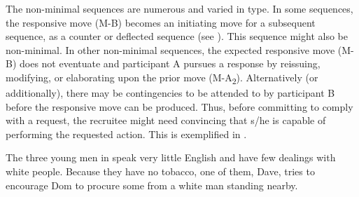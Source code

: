 \documentclass[output=paper,nonflat,colorlinks,citecolor=brown]{langsci/langscibook}
\begin{document}
The non-minimal sequences are numerous and varied in type. In some sequences, the responsive move (M-B) becomes an initiating move for a subsequent sequence, as a counter or deflected sequence (see ). This sequence might also be non-minimal. In other non-minimal sequences, the expected responsive move (M-B) does not eventuate and participant A pursues a response by reissuing, modifying, or elaborating upon the prior move (M-A\textsubscript{2}). Alternatively (or additionally), there may be contingencies to be attended to by participant B before the responsive move can be produced. Thus, before committing to comply with a request, the recruitee might need convincing that s/he is capable of performing the requested action. This is exemplified in .

The three young men in  speak very little English and have few dealings with white people. Because they have no tobacco, one of them, Dave, tries to encourage Dom to procure some from a white man standing nearby.
\end{document}
